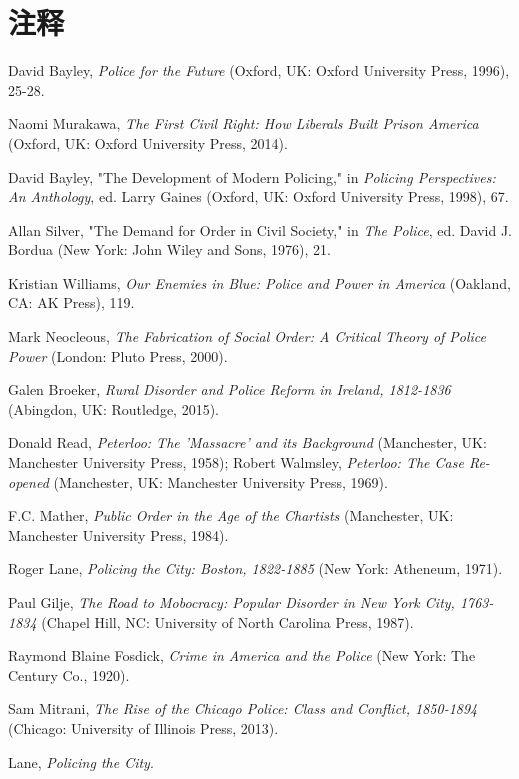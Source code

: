 \documentclass[fontset=fandol, a4paper, 12pt, openright]{ctexbook}
\begin{document}
\section*{注释}
\begin{enumerate}[label={[\arabic*]}]
    \item David Bayley, \textit{Police for the Future} (Oxford, UK: Oxford University Press, 1996), 25-28.
    \item Naomi Murakawa, \textit{The First Civil Right: How Liberals Built Prison America} (Oxford, UK: Oxford University Press, 2014).
    \item David Bayley, "The Development of Modern Policing," in \textit{Policing Perspectives: An Anthology}, ed. Larry Gaines (Oxford, UK: Oxford University Press, 1998), 67.
    \item Allan Silver, "The Demand for Order in Civil Society," in \textit{The Police}, ed. David J. Bordua (New York: John Wiley and Sons, 1976), 21.
    \item Kristian Williams, \textit{Our Enemies in Blue: Police and Power in America} (Oakland, CA: AK Press), 119.
    \item Mark Neocleous, \textit{The Fabrication of Social Order: A Critical Theory of Police Power} (London: Pluto Press, 2000).
    \item Galen Broeker, \textit{Rural Disorder and Police Reform in Ireland, 1812-1836} (Abingdon, UK: Routledge, 2015).
    \item Donald Read, \textit{Peterloo: The 'Massacre' and its Background} (Manchester, UK: Manchester University Press, 1958); Robert Walmsley, \textit{Peterloo: The Case Re-opened} (Manchester, UK: Manchester University Press, 1969).
    \item F.C. Mather, \textit{Public Order in the Age of the Chartists} (Manchester, UK: Manchester University Press, 1984).
    \item Roger Lane, \textit{Policing the City: Boston, 1822-1885} (New York: Atheneum, 1971).
    \item Paul Gilje, \textit{The Road to Mobocracy: Popular Disorder in New York City, 1763-1834} (Chapel Hill, NC: University of North Carolina Press, 1987).
    \item Raymond Blaine Fosdick, \textit{Crime in America and the Police} (New York: The Century Co., 1920).
    \item Sam Mitrani, \textit{The Rise of the Chicago Police: Class and Conflict, 1850-1894} (Chicago: University of Illinois Press, 2013).
    \item Lane, \textit{Policing the City}.

\end{enumerate}
\end{document}
